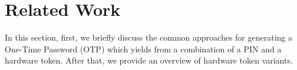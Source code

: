 
\vspace{-3mm}
\section{Related Work}





%
%
%


In this section, first, we briefly discuss the common approaches for generating a One-Time Password (OTP) which yields from a combination of a PIN and a hardware token.  After that, we provide an overview of hardware token variants. 

